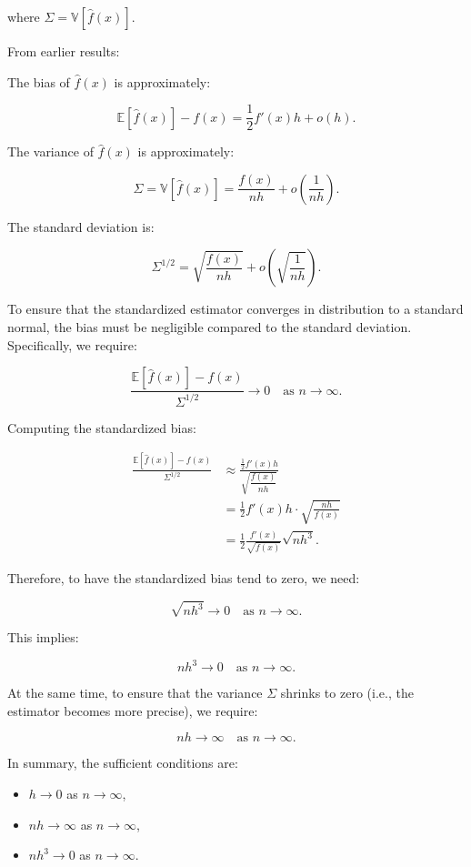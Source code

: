 \documentclass{article}
\begin{document}
where \(\Sigma = \mathbb{V}[\hat{f}(x)]\).

From earlier results:

The bias of \(\hat{f}(x)\) is approximately:

\[
\mathbb{E}[\hat{f}(x)] - f(x) = \frac{1}{2} f'(x) h + o(h).
\]

The variance of \(\hat{f}(x)\) is approximately:

\[
\Sigma = \mathbb{V}[\hat{f}(x)] = \frac{f(x)}{n h} + o\left( \frac{1}{n h} \right).
\]

The standard deviation is:

\[
\Sigma^{1/2} = \sqrt{\frac{f(x)}{n h}} + o\left( \sqrt{\frac{1}{n h}} \right).
\]

To ensure that the standardized estimator converges in distribution to a standard normal, the bias must be negligible compared to the standard deviation. Specifically, we require:

\[
\frac{\mathbb{E}[\hat{f}(x)] - f(x)}{\Sigma^{1/2}} \to 0 \quad \text{as } n \to \infty.
\]

Computing the standardized bias:

\[
\begin{aligned}
\frac{\mathbb{E}[\hat{f}(x)] - f(x)}{\Sigma^{1/2}} &\approx \frac{\frac{1}{2} f'(x) h}{\sqrt{\dfrac{f(x)}{n h}}} \\
&= \frac{1}{2} f'(x) h \cdot \sqrt{\frac{n h}{f(x)}} \\
&= \frac{1}{2} \frac{f'(x)}{\sqrt{f(x)}} \sqrt{n h^3}.
\end{aligned}
\]

Therefore, to have the standardized bias tend to zero, we need:

\[
\sqrt{n h^3} \to 0 \quad \text{as } n \to \infty.
\]

This implies:

\[
n h^3 \to 0 \quad \text{as } n \to \infty.
\]

At the same time, to ensure that the variance \(\Sigma\) shrinks to zero (i.e., the estimator becomes more precise), we require:

\[
n h \to \infty \quad \text{as } n \to \infty.
\]

In summary, the sufficient conditions are:

\begin{itemize}
    \item \( h \to 0 \) as \( n \to \infty \),
    \item \( n h \to \infty \) as \( n \to \infty \),
    \item \( n h^3 \to 0 \) as \( n \to \infty \).
\end{itemize}
\end{document}
